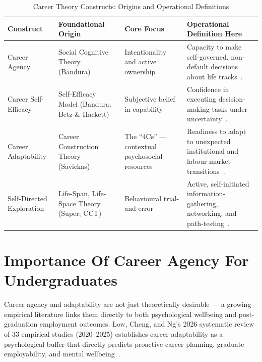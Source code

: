 \begin{table}[htbp]
\centering
\caption{Career Theory Constructs: Origins and Operational Definitions}
\label{tab:career_constructs}
\begin{tabular}{@{}p{3cm}p{3.5cm}p{3.5cm}p{4cm}@{}}
\toprule
\textbf{Construct} & \textbf{Foundational Origin} & \textbf{Core Focus} & \textbf{Operational Definition Here} \\
\midrule
Career Agency & Social Cognitive Theory (Bandura)~\cite{Bandura-1986} & Intentionality and active ownership & Capacity to make self-governed, non-default decisions about life tracks~\cite{Taber-2015}. \\
\addlinespace
Career Self-Efficacy & Self-Efficacy Model (Bandura; Betz \& Hackett)~\cite{Bandura-1986, Hackett-1981} & Subjective belief in capability & Confidence in executing decision-making tasks under uncertainty~\cite{Hackett-1981}. \\
\addlinespace
Career Adaptability & Career Construction Theory (Savickas)~\cite{Savickas-2013, Savickas-2012} & The ``4Cs'' --- contextual psychosocial resources~\cite{Savickas-2012} & Readiness to adapt to unexpected institutional and labour-market transitions~\cite{Taber-2015, Low-2026}. \\
\addlinespace
Self-Directed Exploration & Life-Span, Life-Space Theory (Super; CCT)~\cite{Taber-2015, Savickas-2013} & Behavioural trial-and-error & Active, self-initiated information-gathering, networking, and path-testing~\cite{Taber-2015, Arnett-2000}. \\
\bottomrule
\end{tabular}
\end{table}

\section{Importance Of Career Agency For Undergraduates}

Career agency and adaptability are not just theoretically desirable --- a growing empirical literature links them directly to both psychological wellbeing and post-graduation employment outcomes. Low, Cheng, and Ng's 2026 systematic review of 33 empirical studies (2020--2025) establishes career adaptability as a psychological buffer that directly predicts proactive career planning, graduate employability, and mental wellbeing~\cite{Low-2026}.


